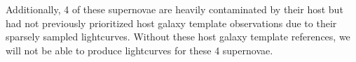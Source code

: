 \documentclass[11pt]{article}
\begin{document}
Additionally, 4 of these supernovae are heavily contaminated by their host but had not previously prioritized 
host galaxy template observations due to their sparsely sampled lightcurves.
Without these host galaxy template references, we will not be able to produce lightcurves for these 4 supernovae.



\end{document}
